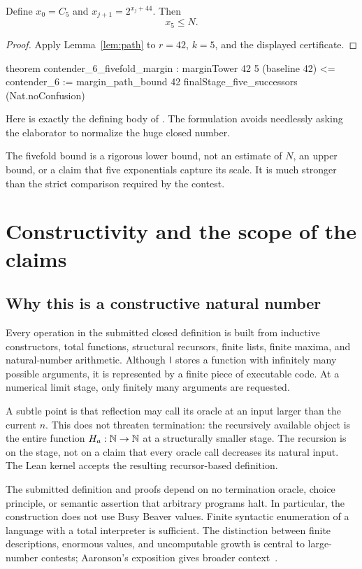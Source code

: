\begin{theorem}\label{thm:margin}
Define \(x_0=C_5\) and \(x_{j+1}=2^{x_j+44}\). Then
\[
                                \boxed{x_5\le N.}
\]
\end{theorem}
\begin{proof}
Apply Lemma~\ref{lem:path} to \(r=42\), \(k=5\), and the displayed
certificate.
\end{proof}
\begin{LeanCode}
theorem contender_6_fivefold_margin :
    marginTower 42 5 (baseline 42) <= contender_6 :=
  margin_path_bound 42 finalStage_five_successors
    (Nat.noConfusion)
\end{LeanCode}
Here  is exactly the defining body of
. The formulation avoids needlessly asking the
elaborator to normalize the huge closed number.

The fivefold bound is a rigorous lower bound, not an estimate of \(N\),
an upper bound, or a claim that five exponentials capture its scale.
It is much stronger than the strict comparison required by the contest.

\section{Constructivity and the scope of the claims}\label{sec:scope}
\subsection{Why this is a constructive natural number}
Every operation in the submitted closed definition is built from
inductive constructors, total functions, structural recursors,
finite lists, finite maxima, and natural-number arithmetic.
Although \(\mathsf l\) stores a function with infinitely many possible
arguments, it is represented by a finite piece of executable code.
At a numerical limit stage, only finitely many arguments are requested.

A subtle point is that reflection may call its oracle at an input
larger than the current \(n\). This does not threaten termination:
the recursively available object is the entire function \(H_a:\mathbb N\to\mathbb N\)
at a structurally smaller stage. The recursion is on the stage,
not on a claim that every oracle call decreases its natural input.
The Lean kernel accepts the resulting recursor-based definition.

The submitted definition and proofs depend on no termination oracle,
choice principle, or semantic assertion that arbitrary programs halt. In particular,
the construction does not use Busy Beaver values. Finite syntactic
enumeration of a language with a total interpreter is sufficient.
The distinction between finite descriptions, enormous values, and
uncomputable growth is central to large-number contests; Aaronson's
exposition gives broader context~\cite{aaronson}.

